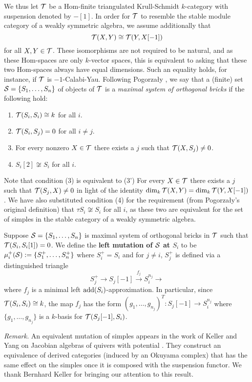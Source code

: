 \documentclass{amsart}
\begin{document}
We thus let $\mathcal{T}$ be a Hom-finite triangulated Krull-Schmidt $k$-category with suspension denoted by $-[1]$.  In order for $\mathcal{T}$ to resemble the stable module category of a weakly symmetric algebra, we assume additionally that $$ \mathcal{T}(X,Y) \cong  \mathcal{T}(Y,X[-1])$$ for all $X, Y \in \mathcal{T}$.  These isomorphisms are not required to be natural, and as these Hom-spaces are only $k$-vector spaces, this is equivalent to asking that these two Hom-spaces always have equal dimensions.  Such an equality holds, for instance, if $\mathcal{T}$ is $-1$-Calabi-Yau.  %
  Following Pogorza\l y \cite{Pog}, we say that a (finite) set $\mathcal{S} = \{S_1, \ldots, S_n\}$ of objects of $\mathcal{T}$ is a {\it maximal system of orthogonal bricks} if the following hold:
\begin{enumerate} 
\item $\mathcal{T}(S_i,S_i) \cong k$ for all $i$.
\item $\mathcal{T}(S_i,S_j) = 0$ for all $i \neq j$.
\item For every nonzero $X \in \mathcal{T}$ there exists a $j$ such that $\mathcal{T}(X, S_j) \neq 0$.
\item $S_i[2] \not \cong S_i$ for all $i$.
\end{enumerate}
Note that condition (3) is equivalent to (3') For every $X \in \mathcal{T}$ there exists a $j$ such that $\mathcal{T}(S_j, X) \neq 0$ in light of the identity $\dim_k \mathcal{T}(X,Y) = \dim_k \mathcal{T}(Y, X[-1])$.   We have also substituted condition (4) for the requirement (from Pogorza\l y's original definition) that $\tau S_i \not \cong S_i$ for all $i$, as these two are equivalent for the set of simples in the stable category of a weakly symmetric algebra.

\begin{defin}  Suppose $\mathcal{S} = \{S_1, \ldots, S_n\}$ is maximal system of orthogonal bricks in $\mathcal{T}$ such that $\mathcal{T}(S_i,S_i[1]) = 0$.  We define the {\bf left mutation of $\mathcal{S}$ at $S_i$} to be $\mu^+_i(\mathcal{S}) := \{S^+_1, \ldots, S^+_n\}$ where $S^+_i = S_i$ and for $j \neq i$, $S^+_j$ is defined via  a distinguished triangle $$S^+_j \rightarrow S_j[-1] \stackrel{f_j}{\rightarrow} S_i^{n_j} \rightarrow$$
where $f_j$ is a minimal left $\mathrm{add}(S_i)$-approximation.  In particular, since $\mathcal{T}(S_i,S_i) \cong k$, the map $f_j$ has the form $(g_1, \ldots, g_{n_j})^T : S_j[-1] \rightarrow S_i^{n_j}$ where $\{g_1, \ldots, g_{n_j}\}$ is a $k$-basis for $\mathcal{T}(S_j[-1],S_i)$.
\end{defin}

\noindent
{\it Remark.}  An equivalent mutation of simples appears in the work of Keller and Yang on Jacobian algebras of quivers with potential  \cite{KellYang}.  They construct an equivalence of derived categories (induced by an Okuyama complex) that has the same effect on the simples once it is composed with the suspension functor.  We thank Bernhard Keller for bringing our attention to this result.\\
\end{document}
